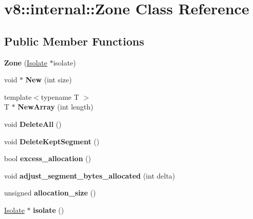 \hypertarget{classv8_1_1internal_1_1_zone}{}\section{v8\+:\+:internal\+:\+:Zone Class Reference}
\label{classv8_1_1internal_1_1_zone}
\subsection*{Public Member Functions}
\begin{DoxyCompactItemize}
\item 
\hypertarget{classv8_1_1internal_1_1_zone_a5137b68a1c1daac36af727d29fa010ee}{}{\bfseries Zone} (\hyperlink{classv8_1_1internal_1_1_isolate}{Isolate} $\ast$isolate)\label{classv8_1_1internal_1_1_zone_a5137b68a1c1daac36af727d29fa010ee}

\item 
\hypertarget{classv8_1_1internal_1_1_zone_abb03163222ff83fe8e52e3a4b027fba3}{}void $\ast$ {\bfseries New} (int size)\label{classv8_1_1internal_1_1_zone_abb03163222ff83fe8e52e3a4b027fba3}

\item 
\hypertarget{classv8_1_1internal_1_1_zone_afb263363ae84d1bb1504dd1f85dabbc8}{}{\footnotesize template$<$typename T $>$ }\\T $\ast$ {\bfseries New\+Array} (int length)\label{classv8_1_1internal_1_1_zone_afb263363ae84d1bb1504dd1f85dabbc8}

\item 
\hypertarget{classv8_1_1internal_1_1_zone_ae9dfff91c451f6e52ef4c2aa7c6946b8}{}void {\bfseries Delete\+All} ()\label{classv8_1_1internal_1_1_zone_ae9dfff91c451f6e52ef4c2aa7c6946b8}

\item 
\hypertarget{classv8_1_1internal_1_1_zone_a5bec6bb7692c77f753081b29b00c78a4}{}void {\bfseries Delete\+Kept\+Segment} ()\label{classv8_1_1internal_1_1_zone_a5bec6bb7692c77f753081b29b00c78a4}

\item 
\hypertarget{classv8_1_1internal_1_1_zone_a30c0303774ba73bc43defba7270c9ef9}{}bool {\bfseries excess\+\_\+allocation} ()\label{classv8_1_1internal_1_1_zone_a30c0303774ba73bc43defba7270c9ef9}

\item 
\hypertarget{classv8_1_1internal_1_1_zone_a46dc35bbafde330956b5e28acf87ac64}{}void {\bfseries adjust\+\_\+segment\+\_\+bytes\+\_\+allocated} (int delta)\label{classv8_1_1internal_1_1_zone_a46dc35bbafde330956b5e28acf87ac64}

\item 
\hypertarget{classv8_1_1internal_1_1_zone_a45f1f751a080a3cbfbda93823102a954}{}unsigned {\bfseries allocation\+\_\+size} ()\label{classv8_1_1internal_1_1_zone_a45f1f751a080a3cbfbda93823102a954}

\item 
\hypertarget{classv8_1_1internal_1_1_zone_a619a433fbd982e1a3c3895bccf47fd02}{}\hyperlink{classv8_1_1internal_1_1_isolate}{Isolate} $\ast$ {\bfseries isolate} ()\label{classv8_1_1internal_1_1_zone_a619a433fbd982e1a3c3895bccf47fd02}

\end{DoxyCompactItemize}
